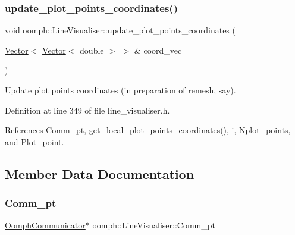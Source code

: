 \mbox{\label{classoomph_1_1LineVisualiser_a88beccc9e1770c7acb14a7e088999ab0}} 
\subsubsection{\texorpdfstring{update\+\_\+plot\+\_\+points\+\_\+coordinates()}{update\_plot\_points\_coordinates()}}
{\footnotesize\ttfamily void oomph\+::\+Line\+Visualiser\+::update\+\_\+plot\+\_\+points\+\_\+coordinates (\begin{DoxyParamCaption}\item[{\hyperlink{classoomph_1_1Vector}{Vector}$<$ \hyperlink{classoomph_1_1Vector}{Vector}$<$ double $>$ $>$ \&}]{coord\+\_\+vec }\end{DoxyParamCaption})\hspace{0.3cm}{\ttfamily [inline]}}



Update plot points coordinates (in preparation of remesh, say). 



Definition at line 349 of file line\+\_\+visualiser.\+h.



References Comm\+\_\+pt, get\+\_\+local\+\_\+plot\+\_\+points\+\_\+coordinates(), i, Nplot\+\_\+points, and Plot\+\_\+point.



\subsection{Member Data Documentation}
\mbox{\label{classoomph_1_1LineVisualiser_a0c950d1578a20b271a1a51f58e469128}} 
\subsubsection{\texorpdfstring{Comm\+\_\+pt}{Comm\_pt}}
{\footnotesize\ttfamily \hyperlink{classoomph_1_1OomphCommunicator}{Oomph\+Communicator}$\ast$ oomph\+::\+Line\+Visualiser\+::\+Comm\+\_\+pt\hspace{0.3cm}{\ttfamily [private]}}



